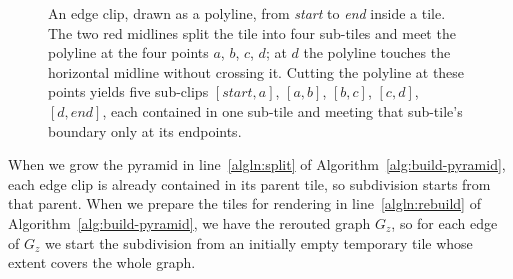 \documentclass[a4paper,USenglish,anonymous]{gd-lipics-v3}
\begin{document}
\begin{figure}[!tb]
  \centering
  \caption{An edge clip, drawn as a polyline, from \emph{start} to
    \emph{end} inside a tile. The two red midlines split the tile
    into four sub-tiles and meet the polyline at the four
    points $a$, $b$, $c$, $d$; at $d$ the polyline touches the
    horizontal midline without crossing it. Cutting the polyline at
    these points yields five sub-clips $[\mathit{start},a]$,
    $[a,b]$, $[b,c]$, $[c,d]$, $[d,\mathit{end}]$, each contained in
    one sub-tile and meeting that sub-tile's boundary only at its
    endpoints.}
  \label{fig:clip}
\end{figure}

When we grow the pyramid in line~\ref{algln:split} of
Algorithm~\ref{alg:build-pyramid}, each edge clip is already
contained in its parent tile, so subdivision starts from that
parent. When we prepare the tiles for rendering in
line~\ref{algln:rebuild} of Algorithm~\ref{alg:build-pyramid}, we
have the rerouted graph $G_z$, so for each edge of $G_z$ we start
the subdivision from an initially empty temporary tile whose extent
covers the whole graph.
\end{document}
